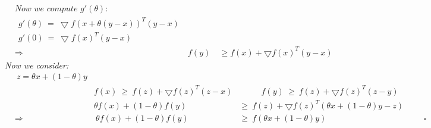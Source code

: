 \documentclass{report}
\begin{document}
\begin{enumerate}[]
\begin{align*}
		 		& \textit{Now we compute } g'(\theta): \\
		 		& \ \ g'(\theta) \ = \ \bigtriangledown f(x+\theta (y-x))^T (y-x) \\
		 		& \ \ g'(0) \ = \ \bigtriangledown f(x)^T (y-x) \\
		 		& \Rightarrow & \ f(y) \ & \geq f(x) + \bigtriangledown f(x)^T (y-x)
		 	\end{align*}
		 	\textit{Now we consider:}
		 	\begin{align*}
		 		& \ z = \theta x + (1-\theta ) y \\
		 		& & f(x) \ \geq \ f(z) + \bigtriangledown f(z)^T (z-x) & \ \ \ \ \ \ \ \ \ \ \ \  f(y) \  \geq \ f(z) + \bigtriangledown f(z)^T (z-y) \\
		 		& & \theta f(x) + (1-\theta ) f(y) \ & \geq \ f(z) + \bigtriangledown f(z)^T (\theta x + (1-\theta)y -z) \\
		 		& \Rightarrow &  \ \theta f(x) + (1-\theta ) f(y) \ & \geq \ f( \theta x + (1-\theta ) y) &&& \square
		 	\end{align*}
		 	
		\end{enumerate}
\end{document}
